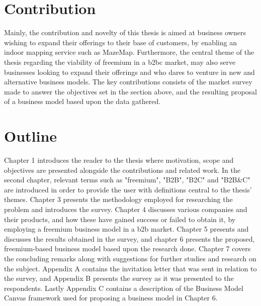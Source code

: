 \section{Contribution}
Mainly, the contribution and novelty of this thesis is aimed at business owners wishing to expand their offerings to their base of customers, by enabling an indoor mapping service such as MazeMap. Furthermore, the central theme of the thesis regarding the viability of freemium in a \gls{b2bc} market, may also serve businesses looking to expand their offerings and who dares to venture in new and alternative business models. The key contributions consists of the market survey made to answer the objectives set in the section above, and the resulting proposal of a business model based upon the data gathered.   

\section{Outline}
Chapter 1 introduces the reader to the thesis where motivation, scope and objectives are presented alongside the contributions and related work. In the second chapter, relevant terms such as "freemium", "B2B", "B2C" and "B2B\&C" are introduced in order to provide the user with definitions central to the thesis' themes. Chapter 3 presents the methodology employed for researching the problem and introduces the survey. Chapter 4 discusses various companies and their products, and how these have gained success or failed to obtain it, by employing a freemium business model in a \gls{b2b} market. Chapter 5 presents and discusses the results obtained in the survey, and chapter 6 presents the proposed, freemium-based business model based upon the research done.
Chapter 7 covers the concluding remarks along with suggestions for further studies and research on the subject. Appendix A contains the invitation letter that was sent in relation to the survey, and Appendix B presents the survey as it was presented to the respondents. Lastly Appendix C contains a description of the Business Model Canvas framework used for proposing a business model in Chapter 6. 


